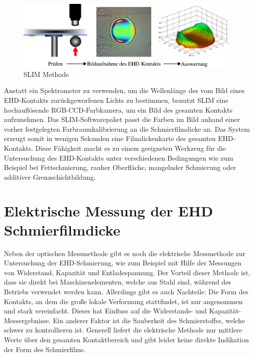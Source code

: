 \begin{figure}[htb]
    \centering
    \includegraphics[]{./images/slim_methode.pdf}
    \caption{SLIM Methode \cite{ehl_broshure}}
    \label{fig:ehd_slim_methode}
\end{figure}

Anstatt ein Spektrometer zu verwenden, um die Wellenlänge des vom Bild eines EHD-Kontakts zurückgeworfenen Lichts zu bestimmen, benutzt SLIM eine hochauflösende RGB-CCD-Farbkamera, um ein Bild des gesamten Kontakts aufzunehmen.
Das SLIM-Softwarepaket passt die Farben im Bild anhand einer vorher festgelegten Farbraumkalibrierung an die Schmierfilmdicke an.
Das System erzeugt somit in wenigen Sekunden eine Filmdickenkarte des gesamten EHD-Kontakts.
Diese Fähigkeit macht es zu einem geeigneten Werkzeug für die Untersuchung des EHD-Kontakts unter verschiedenen Bedingungen wie zum Beispiel bei Fettschmierung, rauher Oberfläche, mangelnder Schmierung oder additiver Grenzschichtbildung.

\section{Elektrische Messung der EHD Schmierfilmdicke}
\label{sec:elektrische_messung_der_ehd_schmierfilmdicke}

Neben der optischen Messmethode gibt es noch die elektrische Messmethode zur Untersuchung der EHD-Schmierung, wie zum Beispiel mit Hilfe der Messungen von Widerstand, Kapazität und Entladespannung.
Der Vorteil dieser Methode ist, dass sie direkt bei Maschinenelementen, welche aus Stahl sind, während des Betriebs verwendet werden kann.
Allerdings gibt es auch Nachteile:
Die Form des Kontakts, an dem die große lokale Verformung stattfindet, ist nur angenommen und stark vereinfacht.
Dieses hat Einfluss auf die Widerstands- und Kapazität-Messergebnisse.
Ein anderer Faktor ist die Sauberkeit des Schmierstoffes, welche schwer zu kontrollieren ist.
Generell liefert die elektrische Methode nur mittlere Werte über den gesamten Kontaktbereich und gibt leider keine direkte Indikation der Form des Schmierfilms.

